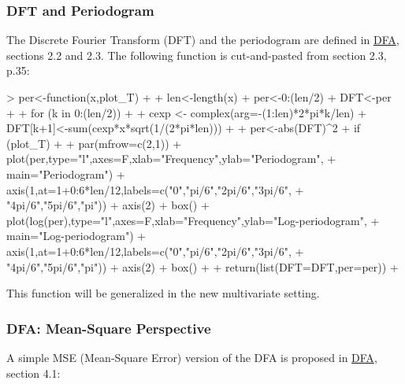 \documentclass[a4paper]{book}
\begin{document}
\subsubsection{DFT and Periodogram}

The Discrete Fourier Transform (DFT) and the periodogram are defined in \href{http://blog.zhaw.ch/sef/files/2014/10/DFA.pdf}{DFA}, sections 2.2 and 2.3. The following function is cut-and-pasted from section 2.3, p.35:



\begin{Schunk}
\begin{Sinput}
> per<-function(x,plot_T)
+ {
+   len<-length(x)
+   per<-0:(len/2)
+   DFT<-per
+ 
+   for (k in 0:(len/2))
+   {
+     cexp <- complex(arg=-(1:len)*2*pi*k/len)
+     DFT[k+1]<-sum(cexp*x*sqrt(1/(2*pi*len)))
+   }
+   per<-abs(DFT)^2
+   if (plot_T)
+   {
+     par(mfrow=c(2,1))
+     plot(per,type="l",axes=F,xlab="Frequency",ylab="Periodogram",
+     main="Periodogram")
+     axis(1,at=1+0:6*len/12,labels=c("0","pi/6","2pi/6","3pi/6",
+     "4pi/6","5pi/6","pi"))
+     axis(2)
+     box()
+     plot(log(per),type="l",axes=F,xlab="Frequency",ylab="Log-periodogram",
+     main="Log-periodogram")
+     axis(1,at=1+0:6*len/12,labels=c("0","pi/6","2pi/6","3pi/6",
+     "4pi/6","5pi/6","pi"))
+     axis(2)
+     box()
+   }
+   return(list(DFT=DFT,per=per))
+ }
\end{Sinput}
\end{Schunk}
This function will be generalized in the new multivariate setting.

\subsubsection{DFA: Mean-Square Perspective}

A simple MSE (Mean-Square Error) version of the DFA is proposed in \href{http://blog.zhaw.ch/sef/files/2014/10/DFA.pdf}{DFA}, section 4.1: 
\end{document}
